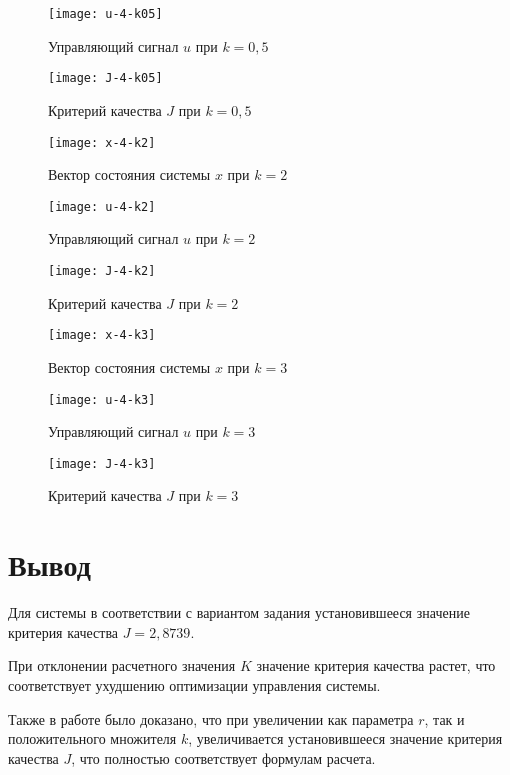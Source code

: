 \documentclass[14pt, a4paper]{extarticle}
\begin{document}
	\begin{figure}[H]
		\centering
		\texttt{[image: u-4-k05]}
		\caption{Управляющий сигнал $u$ при $k=0,5$}
		\label{fig:u-4-k05}
	\end{figure}
	
	\begin{figure}[H]
		\centering
		\texttt{[image: J-4-k05]}
		\caption{Критерий качества $J$ при $k=0,5$}
		\label{fig:J-4-k05}
	\end{figure}

	\begin{figure}[H]
		\centering
		\texttt{[image: x-4-k2]}
		\caption{Вектор состояния системы $x$ при $k=2$}
		\label{fig:x-4-k2}
	\end{figure}
	
	\begin{figure}[H]
		\centering
		\texttt{[image: u-4-k2]}
		\caption{Управляющий сигнал $u$ при $k=2$}
		\label{fig:u-4-k2}
	\end{figure}
	
	\begin{figure}[H]
		\centering
		\texttt{[image: J-4-k2]}
		\caption{Критерий качества $J$ при $k=2$}
		\label{fig:J-4-k2}
	\end{figure}
	
		\begin{figure}[H]
		\centering
		\texttt{[image: x-4-k3]}
		\caption{Вектор состояния системы $x$ при $k=3$}
		\label{fig:x-4-k3}
	\end{figure}
	
	\begin{figure}[H]
		\centering
		\texttt{[image: u-4-k3]}
		\caption{Управляющий сигнал $u$ при $k=3$}
		\label{fig:u-4-k3}
	\end{figure}
	
	\begin{figure}[H]
		\centering
		\texttt{[image: J-4-k3]}
		\caption{Критерий качества $J$ при $k=3$}
		\label{fig:J-4-k3}
	\end{figure}

	\section*{Вывод}
	
	Для системы в соответствии с вариантом задания установившееся значение критерия качества $J=2,8739$.
	
	При отклонении расчетного значения $K$ значение критерия качества растет, что соответствует ухудшению оптимизации управления системы.
	
	Также в работе было доказано, что при увеличении как параметра $r$, так и  положительного множителя $k$, увеличивается установившееся значение критерия качества $J$, что полностью соответствует формулам расчета.
	
\end{document}
